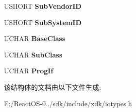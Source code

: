 \begin{DoxyCompactItemize}
U\+S\+H\+O\+RT {\bfseries Sub\+Vendor\+ID}
\item 
\mbox{\label{struct___p_c_i___d_e_v_i_c_e___p_r_e_s_e_n_c_e___p_a_r_a_m_e_t_e_r_s_a49b56a2240baa406f51ba250c36eb6a4}} 
U\+S\+H\+O\+RT {\bfseries Sub\+System\+ID}
\item 
\mbox{\label{struct___p_c_i___d_e_v_i_c_e___p_r_e_s_e_n_c_e___p_a_r_a_m_e_t_e_r_s_a6886ab1cf2acb643199ef6e58ce647bf}} 
U\+C\+H\+AR {\bfseries Base\+Class}
\item 
\mbox{\label{struct___p_c_i___d_e_v_i_c_e___p_r_e_s_e_n_c_e___p_a_r_a_m_e_t_e_r_s_a951cce54e6f9cbb5115df4a97d95a156}} 
U\+C\+H\+AR {\bfseries Sub\+Class}
\item 
\mbox{\label{struct___p_c_i___d_e_v_i_c_e___p_r_e_s_e_n_c_e___p_a_r_a_m_e_t_e_r_s_a69a6cca119383792c375264566ac93e9}} 
U\+C\+H\+AR {\bfseries Prog\+If}
\end{DoxyCompactItemize}


该结构体的文档由以下文件生成\+:\begin{DoxyCompactItemize}
\item 
E\+:/\+React\+O\+S-\/0../sdk/include/xdk/iotypes.\+h\end{DoxyCompactItemize}
